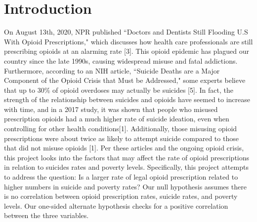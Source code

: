 \documentclass{article}
\newcommand{\<}{\langle}
\renewcommand{\>}{\rangle}
\theoremstyle{definition}
\begin{document}
\section*{Introduction}
\hspace{\parindent} On August 13th, 2020, NPR published ``Doctors and Dentists Still Flooding U.S With Opioid Prescriptions," which discusses how health care professionals are still prescribing opioids at an alarming rate [3]. This opioid epidemic has plagued our country since the late 1990s, causing widespread misuse and fatal addictions. Furthermore, according to an NIH article, ``Suicide Deaths are a Major Component of the Opioid Crisis that Must be Addressed," some experts believe that up to 30\% of opioid overdoses may actually be suicides [5]. In fact, the strength of the relationship between suicides and opioids have seemed to increase with time, and in a 2017 study, it was shown that people who misused prescription opioids had a much higher rate of suicide ideation, even when controlling for other health conditions[1]. Additionally, those misusing opioid prescriptions were about twice as likely to attempt suicide compared to those that did not misuse opioids [1]. Per these articles and the ongoing opioid crisis, this project looks into the factors that may affect the rate of opioid prescriptions in relation to suicides rates and poverty levels. Specifically, this project attempts to address the question: Is a larger rate of legal opioid prescription related to higher numbers in suicide and poverty rates? Our null hypothesis assumes there is no correlation between opioid prescription rates, suicide rates, and poverty levels. Our one-sided alternate hypothesis checks for a positive correlation between the three variables. 


\end{document}

